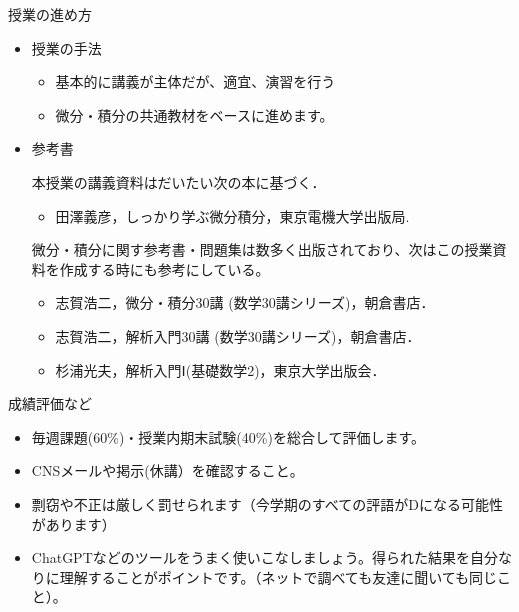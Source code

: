 \begin{slide}{授業の進め方}
\begin{itemize}
\item 授業の手法
\begin{itemize}
\item 基本的に講義が主体だが、適宜、演習を行う
\item 微分・積分の共通教材をベースに進めます。
\end{itemize}

\item 参考書

本授業の講義資料はだいたい次の本に基づく．
\begin{itemize}
\item 田澤義彦，しっかり学ぶ微分積分，東京電機大学出版局.
\end{itemize}
微分・積分に関す参考書・問題集は数多く出版されており、次はこの授業資料を作成する時にも参考にしている。
\begin{itemize}
\item 志賀浩二，微分・積分30講 (数学30講シリーズ)，朝倉書店．
\item 志賀浩二，解析入門30講 (数学30講シリーズ)，朝倉書店．
\item 杉浦光夫，解析入門Ⅰ(基礎数学2)，東京大学出版会．
\end{itemize}
\end{itemize}
\end{slide}

\begin{slide}{成績評価など}
\begin{itemize}
\item 毎週課題(60\%)・授業内期末試験(40\%)を総合して評価します。
\item CNSメールや掲示(休講）を確認すること。
\item 剽窃や不正は厳しく罰せられます（今学期のすべての評語がDになる可能性があります）
\item ChatGPTなどのツールをうまく使いこなしましょう。得られた結果を自分なりに理解することがポイントです。（ネットで調べても友達に聞いても同じこと）。
\end{itemize}
\end{slide}

